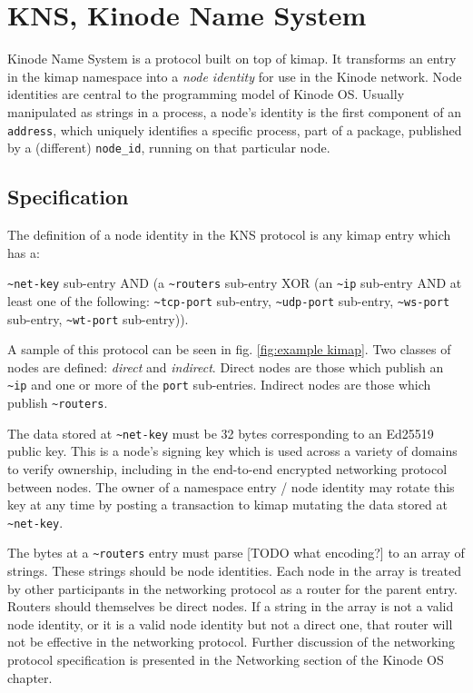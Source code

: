 \documentclass[runningheads]{llncs}
\begin{document}
\section{KNS, Kinode Name System}

Kinode Name System is a protocol built on top of kimap.
It transforms an entry in the kimap namespace into a \textit{node identity} for use in the Kinode network.
Node identities are central to the programming model of Kinode OS.
Usually manipulated as strings in a process, a node's identity is the first component of an \verb|address|, which uniquely identifies a specific process, part of a package, published by a (different) \verb|node_id|, running on that particular node.

\subsection{Specification}

The definition of a node identity in the KNS protocol is any kimap entry which has a:

\verb|~net-key| sub-entry AND (a \verb|~routers| sub-entry XOR (an \verb|~ip| sub-entry AND at least one of the following: \verb|~tcp-port| sub-entry, \verb|~udp-port| sub-entry, \verb|~ws-port| sub-entry, \verb|~wt-port| sub-entry)).

A sample of this protocol can be seen in fig. \ref{fig:example kimap}. Two classes of nodes are defined: \textit{direct} and \textit{indirect}. Direct nodes are those which publish an \verb|~ip| and one or more of the \verb|port| sub-entries. Indirect nodes are those which publish \verb|~routers|.

The data stored at \verb|~net-key| must be 32 bytes corresponding to an Ed25519 public key.
This is a node's signing key which is used across a variety of domains to verify ownership, including in the end-to-end encrypted networking protocol between nodes.
The owner of a namespace entry / node identity may rotate this key at any time by posting a transaction to kimap mutating the data stored at \verb|~net-key|.

The bytes at a \verb|~routers| entry must parse [TODO what encoding?] to an array of strings.
These strings should be node identities.
Each node in the array is treated by other participants in the networking protocol as a router for the parent entry.
Routers should themselves be direct nodes.
If a string in the array is not a valid node identity, or it is a valid node identity but not a direct one, that router will not be effective in the networking protocol.
Further discussion of the networking protocol specification is presented in the Networking section of the Kinode OS chapter.
\end{document}
